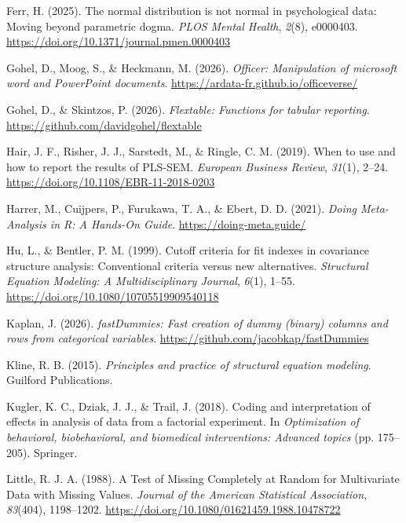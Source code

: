 \documentclass[
  letterpaper,
  DIV=11,
  numbers=noendperiod]{scrreprt}
\newlength{\cslhangindent}
\newenvironment{CSLReferences}[2] %
 {\begin{list}{}{%
  \setlength{\itemindent}{0pt}
  \setlength{\leftmargin}{0pt}
  \setlength{\parsep}{0pt}
  \ifodd #1
   \setlength{\leftmargin}{\cslhangindent}
   \setlength{\itemindent}{-1\cslhangindent}
  \fi
  \setlength{\itemsep}{#2\baselineskip}}}
 {\end{list}}
\begin{document}
\begin{CSLReferences}{1}{0}
Ferr, H. (2025). The normal distribution is not normal in psychological
data: Moving beyond parametric dogma. \emph{PLOS Mental Health},
\emph{2}(8), e0000403.
\url{https://doi.org/10.1371/journal.pmen.0000403}

Gohel, D., Moog, S., \& Heckmann, M. (2026). \emph{Officer: Manipulation
of microsoft word and PowerPoint documents}.
\url{https://ardata-fr.github.io/officeverse/}

Gohel, D., \& Skintzos, P. (2026). \emph{Flextable: Functions for
tabular reporting}. \url{https://github.com/davidgohel/flextable}

Hair, J. F., Risher, J. J., Sarstedt, M., \& Ringle, C. M. (2019). When
to use and how to report the results of PLS-SEM. \emph{European Business
Review}, \emph{31}(1), 2--24.
\url{https://doi.org/10.1108/EBR-11-2018-0203}

Harrer, M., Cuijpers, P., Furukawa, T. A., \& Ebert, D. D. (2021).
\emph{Doing Meta-Analysis in R: A Hands-On Guide}.
\url{https://doing-meta.guide/}

Hu, L., \& Bentler, P. M. (1999). Cutoff criteria for fit indexes in
covariance structure analysis: Conventional criteria versus new
alternatives. \emph{Structural Equation Modeling: A Multidisciplinary
Journal}, \emph{6}(1), 1--55.
\url{https://doi.org/10.1080/10705519909540118}

Kaplan, J. (2026). \emph{fastDummies: Fast creation of dummy (binary)
columns and rows from categorical variables}.
\url{https://github.com/jacobkap/fastDummies}

Kline, R. B. (2015). \emph{Principles and practice of structural
equation modeling}. Guilford Publications.

Kugler, K. C., Dziak, J. J., \& Trail, J. (2018). Coding and
interpretation of effects in analysis of data from a factorial
experiment. In \emph{Optimization of behavioral, biobehavioral, and
biomedical interventions: Advanced topics} (pp. 175--205). Springer.

Little, R. J. A. (1988). A Test of Missing Completely at Random for
Multivariate Data with Missing Values. \emph{Journal of the American
Statistical Association}, \emph{83}(404), 1198--1202.
\url{https://doi.org/10.1080/01621459.1988.10478722}


\end{CSLReferences}
\end{document}
